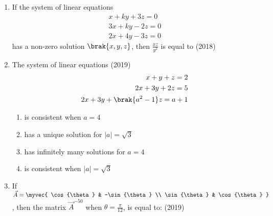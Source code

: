 \begin{enumerate}
\begin{enumerate}
\end{enumerate} 
\item If the system of linear equations 
\begin{align*}x+ky+3z=0 \\
3x+ky-2z=0 \\
2x+4y-3z=0 \end{align*}
has a non-zero solution $$, then $$ is equal to 
\hfill{(2018)}
\begin{enumerate}
\end{enumerate}
\item The system of linear equations 
\hfill{(2019)}
\begin{align*}x+y+z=2 \\
2x+3y+2z=5 \\
2x+3y+\brak{a^2-1}z=a+1 \end{align*} 
\begin{multicols}{2}
\begin{enumerate}
    \item is consistent when $a=4$
    \item has a unique solution for $|a|= $
    \item has infinitely many solutions for $a=4$
    \item is consistent when $|a|= $
\end{enumerate}
\end{multicols}
\item If $= \myvec{
    \cos{\theta} & -\sin{\theta} \\
    \sin{\theta} & \cos{\theta}
}$, then the matrix $^{-50}$ when $\theta=$, is equal to: 
\hfill{(2019)}
\begin{enumerate}
\begin{multicols}{2}


\end{multicols}
\end{enumerate}
\end{enumerate}
